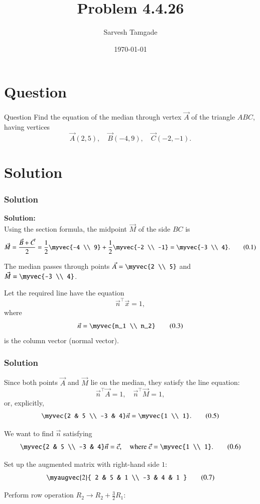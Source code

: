\documentclass{beamer}
\title{Problem 4.4.26}
\author{Sarvesh Tamgade}
\date{\today}
\numberwithin{equation}{section}
\begin{document}
\begin{frame}
\titlepage
\end{frame}

\section{Question}
\begin{frame}{Question}
 Find the equation of the median through vertex \(\vec{A}\) of the triangle \(ABC\), having vertices
\[
\vec{A}(2,5), \quad \vec{B}(-4,9), \quad \vec{C}(-2,-1).
\]

\end{frame}

\section{Solution}
\begin{frame}[fragile]
    \frametitle{Solution}
\textbf{Solution:} \\

Using the section formula, the midpoint \(\vec{M}\) of the side \(BC\) is
\[
\vec{M} = \frac{\vec{B} + \vec{C}}{2} = 
\frac{1}{2} \myvec{-4 \\ 9} + 
\frac{1}{2} \myvec{-2 \\ -1} = 
\myvec{-3 \\ 4}.
\tag{0.1}
\]

The median passes through points \(\vec{A} = \myvec{2 \\ 5}\) and \(\vec{M} = \myvec{-3 \\ 4}\).

Let the required line have the equation
\[
\vec{n}^\top \vec{x} = 1,
\tag{0.2}
\]
where
\[
\vec{n} = \myvec{n_1 \\ n_2}
\tag{0.3}
\]
is the column vector (normal vector).


\end{frame}
\begin{frame}[fragile]
    \frametitle{Solution}

Since both points \(\vec{A}\) and \(\vec{M}\) lie on the median, they satisfy the line equation:
\[
\vec{n}^\top \vec{A} = 1, \quad \vec{n}^\top \vec{M} = 1,
\tag{0.4}
\]
or, explicitly,
\[
\myvec{2 & 5 \\ -3 & 4} \vec{n} = \myvec{1 \\ 1}.
\tag{0.5}
\]

We want to find \(\vec{n}\) satisfying
\[
\myvec{2 & 5 \\ -3 & 4} \vec{n} = \vec{c},
\quad \text{where } \vec{c} = \myvec{1 \\ 1}.
\tag{0.6}
\]

Set up the augmented matrix with right-hand side \(1\):
\[
\myaugvec{2}{
2 & 5 & 1 \\
-3 & 4 & 1
}
\tag{0.7}
\]

Perform row operation \(R_2 \to R_2 + \frac{3}{2} R_1\):

\end{frame}
\end{document}
